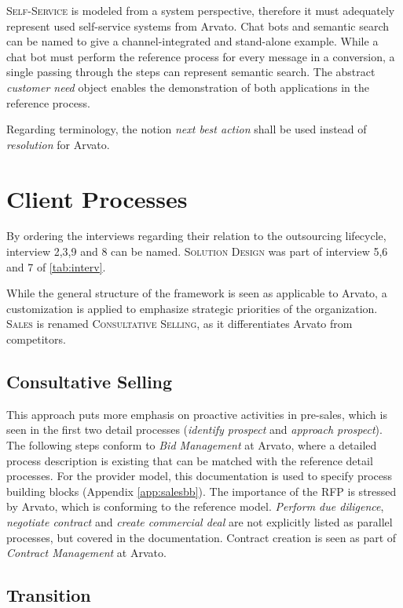 	\textsc{Self-Service} is modeled from a system perspective, therefore it must adequately represent used self-service systems from Arvato. Chat bots and semantic search can be named to give a channel-integrated and stand-alone example. While a chat bot must perform the reference process for every message in a conversion, a single passing through the steps can represent semantic search. The abstract \textit{customer need}  object enables the demonstration of both applications in the reference process.   

	Regarding terminology, the notion \textit{next best action} shall be used instead of \textit{resolution} for Arvato. 
	\section{Client Processes}
	By ordering the interviews regarding their relation to the outsourcing lifecycle, interview 2,3,9 and 8 can be named. \textsc{Solution Design} was part of interview 5,6 and 7 of \Tab \ref{tab:interv}.
	
	While the general structure of the framework is seen as applicable to Arvato, a customization is applied to emphasize strategic priorities of the organization. \textsc{Sales} is renamed \textsc{Consultative Selling}, as it differentiates Arvato from competitors. 
	
	\subsection{Consultative Selling}
	
	This approach puts more emphasis on proactive activities in pre-sales, which is seen in the first two detail processes (\textit{identify prospect} and \textit{approach prospect}). The following steps conform to \textit{Bid Management} at Arvato, where a detailed process description is existing that can be matched with the reference detail processes. For the provider model, this documentation is used to specify process building blocks (\cf Appendix \ref{app:salesbb}). 	The importance of the  \acrshort{RFP} is stressed by Arvato, which is conforming to the reference model. \textit{Perform due diligence}, \textit{negotiate contract} and \textit{create commercial deal} are not explicitly listed as parallel processes, but covered in the documentation. Contract creation is seen as part of \textit{Contract Management} at Arvato. 
	
	\subsection{Transition}
	
